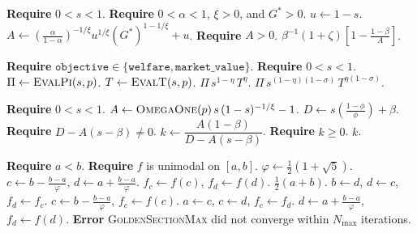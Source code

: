 \documentclass[11pt]{article}
\begin{document}
\begin{algorithm}[H]
\caption{\textsc{PolicySubroutines}$(p)$}
\begin{algorithmic}[1]
    \State \textbf{Require} $0<s<1$.
    \State \textbf{Require} $0<\alpha<1$, $\xi>0$, and $G^*>0$.
    \State $u \gets 1-s$.
    \State $A \gets \left(\frac{\alpha}{1-\alpha}\right)^{-1/\xi}u^{1/\xi}(G^*)^{1-1/\xi} + u$.
    \State \textbf{Require} $A>0$.
    \State \Return $\beta^{-1}(1+\zeta)\left[1-\frac{1-\beta}{A}\right]$.
\EndFunction

    \State \textbf{Require} $\texttt{objective}\in\{\texttt{welfare},\texttt{market\_value}\}$.
    \State \textbf{Require} $0<s<1$.
    \State $\Pi \gets \textsc{EvalPi}(s,p)$.
    \State $T \gets \textsc{EvalT}(s,p)$.
        \State \Return $\Pi\,s^{1-\eta}\,T^{\eta}$.
    \Else
        \State \Return $\Pi\,s^{(1-\eta)(1-\sigma)}\,T^{\eta(1-\sigma)}$.
    \EndIf
\EndFunction

    \State \textbf{Require} $0<s<1$.
    \State $A \gets \textsc{OmegaOne}(p)\,s\,(1-s)^{-1/\xi}-1$.
    \State $D \gets s\left(\frac{1-\phi}{\phi}\right)+\beta$.
    \State \textbf{Require} $D-A(s-\beta)\neq 0$.
    \State $k \gets \dfrac{A(1-\beta)}{D-A(s-\beta)}$.
    \State \textbf{Require} $k\ge 0$.
    \State \Return $k$.
\EndFunction
\end{algorithmic}
\end{algorithm}

\begin{algorithm}[H]
\caption{\textsc{GoldenSectionMax}$(f,a,b,\varepsilon,N_{\max})$}
\begin{algorithmic}[1]
\State \textbf{Require} $a<b$.
\State \textbf{Require} $f$ is unimodal on $[a,b]$.
\State $\varphi \gets \tfrac{1}{2}(1+\sqrt{5})$.
\State $c \gets b-\tfrac{b-a}{\varphi}$, $d \gets a+\tfrac{b-a}{\varphi}$.
\State $f_c \gets f(c)$, $f_d \gets f(d)$.
        \State \Return $\tfrac{1}{2}(a+b)$.
    \EndIf
        \State $b \gets d$, $d \gets c$, $f_d \gets f_c$.
        \State $c \gets b-\tfrac{b-a}{\varphi}$, $f_c \gets f(c)$.
    \Else
        \State $a \gets c$, $c \gets d$, $f_c \gets f_d$.
        \State $d \gets a+\tfrac{b-a}{\varphi}$, $f_d \gets f(d)$.
    \EndIf
\EndFor
\State \textbf{Error} \textsc{GoldenSectionMax} did not converge within $N_{\max}$ iterations.
\end{algorithmic}
\end{algorithm}
\end{document}
